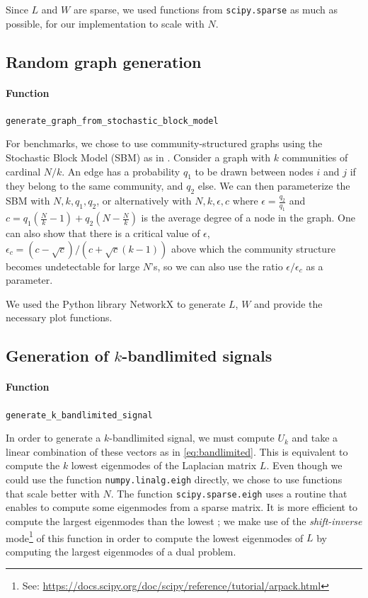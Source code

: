 \documentclass{article}
\begin{document}
Since $L$ and $W$ are sparse, we used functions from \verb#scipy.sparse# as much as possible, for our implementation to scale with $N$.


\subsection{Random graph generation} \label{subs:random_graph_generation}


\paragraph{Function} \verb#generate_graph_from_stochastic_block_model#


For benchmarks, we chose to use community-structured graphs using the Stochastic Block Model (SBM) as in \cite{tremblay2017}. Consider a graph with $k$ communities of cardinal $N/k$. An edge has a probability $q_1$ to be drawn between nodes $i$ and $j$ if they belong to the same community, and $q_2$ else. We can then parameterize the SBM with $N, k, q_1, q_2$, or alternatively with $N, k, \epsilon, c$ where $\epsilon = \frac{q_2}{q_1}$ and $c = q_1 \left( \frac{N}{k} - 1 \right) + q_2 \left(N - \frac{N}{k}\right)$ is the average degree of a node in the graph. One can also show that there is a critical value of $\epsilon$, $\epsilon_c = (c - \sqrt{c})/(c + \sqrt{c}(k-1))$ above which the community structure becomes undetectable for large $N$'s, so we can also use the ratio $\epsilon/\epsilon_c$ as a parameter.


We used the Python library NetworkX \cite{hagberg2008} to generate $L$, $W$ and provide the necessary plot functions. 


\subsection[Generation of k-bandlimited signals]{Generation of $k$-bandlimited signals} \label{subsec:gen:k:bandlimited}


\paragraph{Function} \verb#generate_k_bandlimited_signal#


In order to generate a $k$-bandlimited signal, we must compute $U_k$ and take a linear combination of these vectors as in \eqref{eq:bandlimited}. This is equivalent to compute the $k$ lowest eigenmodes of the Laplacian matrix $L$. Even though we could use the function \verb#numpy.linalg.eigh# directly, we chose to use functions that scale better with $N$. The function \verb#scipy.sparse.eigh# uses a routine that enables to compute some eigenmodes from a sparse matrix. It is more efficient to compute the largest eigenmodes than the lowest ; we make use of the \emph{shift-inverse} mode\footnote{See: \url{https://docs.scipy.org/doc/scipy/reference/tutorial/arpack.html}} of this function in order to compute the lowest eigenmodes of $L$ by computing the largest eigenmodes of a dual problem.
\end{document}
